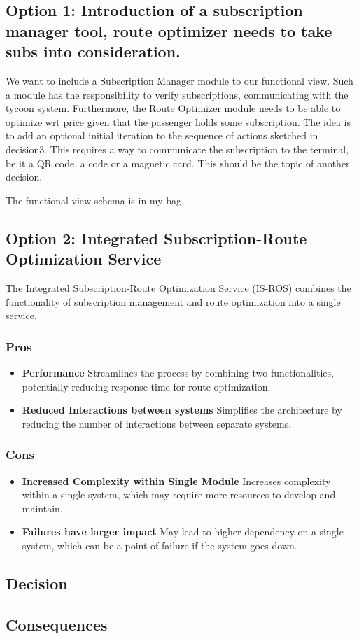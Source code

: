\subsection*{Option 1: Introduction of a subscription manager tool, route optimizer needs to take subs into consideration.}
We want to include a Subscription Manager module to our functional view. 
Such a module has the responsibility to verify subscriptions, communicating with the tycoon system.
Furthermore, the Route Optimizer module needs to be able to optimize wrt price given that the passenger holds some subscription.
The idea is to add an optional initial iteration to the sequence of actions sketched in decision3.
This requires a way to communicate the subscription to the terminal, be it a QR code, a code or a magnetic card. 
This should be the topic of another decision.

The functional view schema is in my bag.

\subsection*{Option 2: Integrated Subscription-Route Optimization Service}
The Integrated Subscription-Route Optimization Service (IS-ROS) combines the functionality of subscription management and route optimization into a single service. 
\subsubsection*{Pros}
\begin{itemize}[noitemsep]
    \item \textbf{Performance} Streamlines the process by combining two functionalities, potentially reducing response time for route optimization.
    \item \textbf{Reduced Interactions between systems} Simplifies the architecture by reducing the number of interactions between separate systems.
\end{itemize}
\subsubsection*{Cons}
\begin{itemize}[noitemsep]
    \item \textbf{Increased Complexity within Single Module} Increases complexity within a single system, which may require more resources to develop and maintain.
    \item \textbf{Failures have larger impact} May lead to higher dependency on a single system, which can be a point of failure if the system goes down.
\end{itemize}

\subsection*{Decision}

\subsection*{Consequences}

